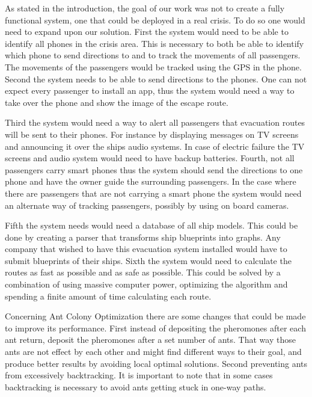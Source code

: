 As stated in the introduction, the goal of our work was not to create a fully functional system, one that could be deployed in a real crisis. To do so one would need to expand upon our solution. First the system would need to be able to identify all phones in the crisis area. This is necessary to both be able to identify which phone to send directions to and to track the movements of all passengers. The movements of the passengers would be tracked using the GPS in the phone. Second the system needs to be able to send directions to the phones. One can not expect every passenger to install an app, thus the system would need a way to take over the phone and show the image of the escape route. 

Third the system would need a way to alert all passengers that evacuation routes will be sent to their phones. For instance by displaying messages on TV screens and announcing it over the ships audio systems. In case of electric failure the TV screens and audio system would need to have backup batteries.  Fourth, not all passengers carry smart phones thus the system should send the directions to one phone and have the owner guide the surrounding passengers. In the case where there are passengers that are not carrying a smart phone the system would need an alternate way of tracking passengers, possibly by using on board cameras.

Fifth the system needs would need a database of all ship models. This could be done by creating a parser that transforms ship blueprints into graphs. Any company that wished to have this evacuation system installed would have to submit blueprints of their ships. Sixth the system would need to calculate the routes as fast as possible and as safe as possible. This could be solved by a combination of using massive computer power, optimizing the algorithm and spending a finite amount of time calculating each route.

Concerning Ant Colony Optimization there are some changes that could be made to improve its performance. First instead of depositing the pheromones after each ant return, deposit the pheromones after a set number of ants. That way those ants are not effect by each other and might find different ways to their goal, and produce better results by avoiding local optimal solutions. Second preventing ants from excessively backtracking. It is important to note that in some cases backtracking is necessary to avoid ants getting stuck in one-way paths.